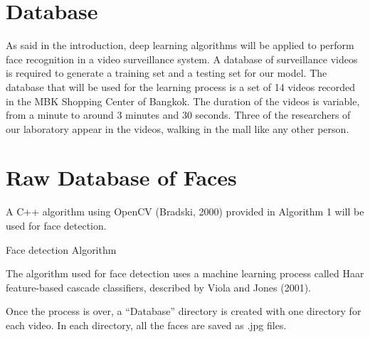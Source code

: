 \section{Database}
As said in the introduction, deep learning algorithms will be applied to perform face recognition in a video surveillance system. A database of surveillance videos is required to generate a training set and a testing set for our model.
The database that will be used for the learning process is a set of 14 videos recorded in the MBK Shopping Center of Bangkok. The duration of the videos is variable, from a minute to around 3 minutes and 30 seconds. Three of the researchers of our laboratory appear in the videos, walking in the mall like any other person.

\section{Raw Database of Faces}

A C++ algorithm using OpenCV (Bradski, 2000) provided in Algorithm 1 will be used for face detection.

\begin{algorithm}[H]
 \caption{Face detection Algorithm}
\end{algorithm}

The algorithm used for face detection uses a machine learning process called Haar feature-based cascade classifiers, described by Viola and Jones (2001).

Once the process is over, a \enquote{Database} directory is created with one directory for each video. In each directory, all the faces are saved as .jpg files.


